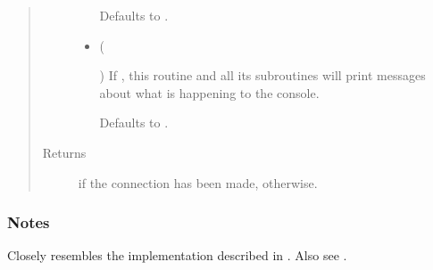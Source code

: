 \documentclass[letterpaper,10pt,english]{sphinxmanual}
\begin{document}
\begin{fulllineitems}
\begin{fulllineitems}
\begin{quote}
\begin{description}
\begin{itemize}
Defaults to .


\item {} 
 (%
\begin{footnote}[118]\sphinxAtStartFootnote
{}
%
\end{footnote}\sphinxstyleliteralemphasis{\sphinxupquote{, }}) \textendash{} 
If , this routine and all its subroutines will print
messages about what is happening to the console.

Defaults to .


\end{itemize}

\item[{Returns}] \leavevmode
{} \textendash{}  if the connection has been made,
 otherwise.

\end{description}\end{quote}
\subsubsection*{Notes}

Closely resembles the implementation described in  \sphinxfootnotemark[1]. Also see
 \sphinxfootnotemark[2].

\end{fulllineitems}



\end{fulllineitems}
\end{document}
